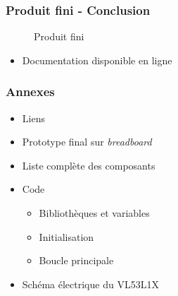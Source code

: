 \documentclass{beamer}
\begin{document}
\begin{frame}
\frametitle{Produit fini - Conclusion}
\begin{figure}
\centering
{}
\qquad
{}
\caption{Produit fini}
\end{figure}
\begin{itemize}
\item Documentation disponible en ligne
\end{itemize}
\end{frame}



\begin{frame}
\frametitle{Annexes}
\begin{itemize}
\item Liens
\item Prototype final sur {\it breadboard}
\item Liste complète des composants
\item Code
    \begin{itemize}
    \item Bibliothèques et variables
    \item Initialisation
    \item Boucle principale
    \end{itemize}
\item Schéma électrique du VL53L1X
\end{itemize}
\end{frame}
\end{document}
